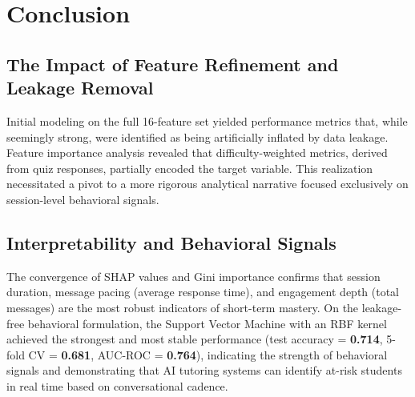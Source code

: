 \documentclass[conference]{IEEEtran}
\begin{document}
\section{Conclusion}

\subsection {The Impact of Feature Refinement and Leakage Removal}

Initial modeling on the full 16-feature set yielded performance metrics that, while seemingly strong, were identified as being artificially inflated by data leakage. Feature importance analysis revealed that difficulty-weighted metrics, derived from quiz responses, partially encoded the target variable. This realization necessitated a pivot to a more rigorous analytical narrative focused exclusively on session-level behavioral signals.

\subsection{Interpretability and Behavioral Signals}

The convergence of SHAP values and Gini importance confirms that session duration, message pacing (average response time), and engagement depth (total messages) are the most robust indicators of short-term mastery. On the leakage-free behavioral formulation, the Support Vector Machine with an RBF kernel achieved the strongest and most stable performance (test accuracy = \textbf{0.714}, 5-fold CV = \textbf{0.681}, AUC-ROC = \textbf{0.764}), indicating the strength of behavioral signals and demonstrating that AI tutoring systems can identify at-risk students in real time based on conversational cadence.
\end{document}

